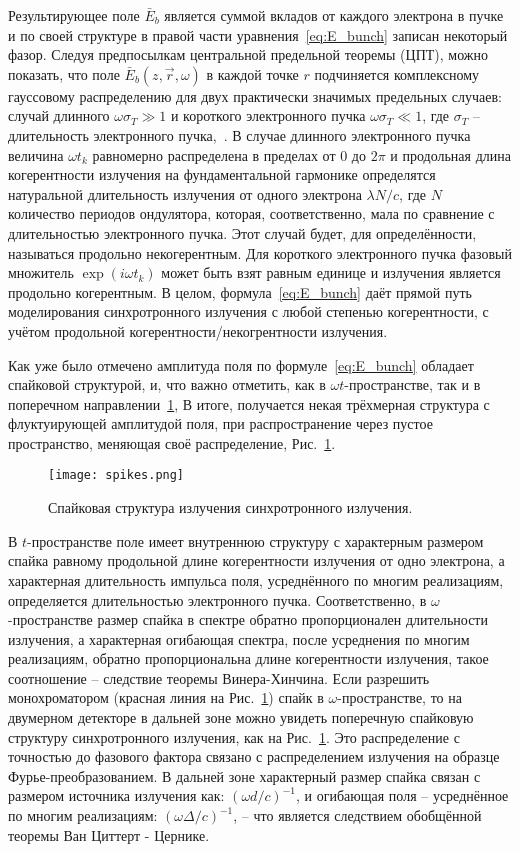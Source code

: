 Результирующее поле $\bar{E}_{b}$ является суммой вкладов от каждого электрона в пучке и по своей структуре в правой части уравнения~\ref{eq:E_bunch} записан некоторый фазор. Следуя предпосылкам центральной предельной теоремы (ЦПТ), можно показать, что поле $\bar{E}_{b}(z, \vec{r}, \omega)$ в каждой точке $r$ подчиняется комплексному гауссовому распределению для двух практически значимых предельных случаев: случай длинного $\omega\sigma_T \gg 1$ и короткого электронного пучка $\omega\sigma_T \ll 1$, где $\sigma_T$ -- длительность электронного пучка,~\cite{geloni_transverse_2008}. В случае длинного электронного пучка величина $\omega t_k$ равномерно распределена в пределах от $0$ до $2\pi$ и продольная длина когерентности излучения на фундаментальной гармонике определятся натуральной длительность излучения от одного электрона $\lambda N /c$, где $N$ количество периодов ондулятора, которая, соответственно, мала по сравнение с длительностью электронного пучка. Этот случай будет, для определённости, называться продольно некогерентным. Для короткого электронного пучка фазовый множитель $\exp{(i \omega t_k)}$ может быть взят равным единице и излучения является продольно когерентным. В целом, формула~\ref{eq:E_bunch} даёт прямой путь моделирования синхротронного излучения с любой степенью когерентности, с учётом продольной когерентности/некогрентности излучения.

Как уже было отмечено амплитуда поля по формуле~\ref{eq:E_bunch} обладает спайковой структурой, и, что важно отметить, как в $\omega t$-пространстве, так и в поперечном направлении~\ref{fig:spikes}, В итоге, получается некая трёхмерная структура с флуктуирующей амплитудой поля, при распространение через пустое пространство, меняющая своё распределение, Рис.~\ref{fig:spikes}. 
\begin{figure}
	\centering 	\texttt{[image: spikes.png]}
	\caption{Спайковая структура излучения синхротронного излучения.}
	\label{fig:spikes}
\end{figure}
В $t$-пространстве поле имеет внутреннюю структуру с характерным размером спайка равному продольной длине когерентности излучения от одно электрона, а характерная длительность импульса поля, усреднённого по многим реализациям, определяется длительностью электронного пучка. Соответственно, в $\omega$-пространстве размер спайка в спектре обратно пропорционален длительности излучения, а характерная огибающая спектра, после усреднения по многим реализациям, обратно пропорциональна длине когерентности излучения, такое соотношение -- следствие теоремы Винера-Хинчина. Если разрешить монохроматором (красная линия на Рис.~\ref{fig:spikes}) спайк в $\omega$-пространстве, то на двумерном детекторе в дальней зоне можно увидеть поперечную спайковую структуру синхротронного излучения, как на Рис.~\ref{fig:spikes}. Это распределение с точностью до фазового фактора связано с распределением излучения на образце Фурье-преобразованием. В дальней зоне характерный размер спайка связан с размером источника излучения как:  $(\omega d /c)^{-1}$, и огибающая поля -- усреднённое по многим реализациям: $(\omega \Delta /c)^{-1}$, -- что является следствием обобщённой теоремы Ван Циттерт - Цернике. 


\newpage






